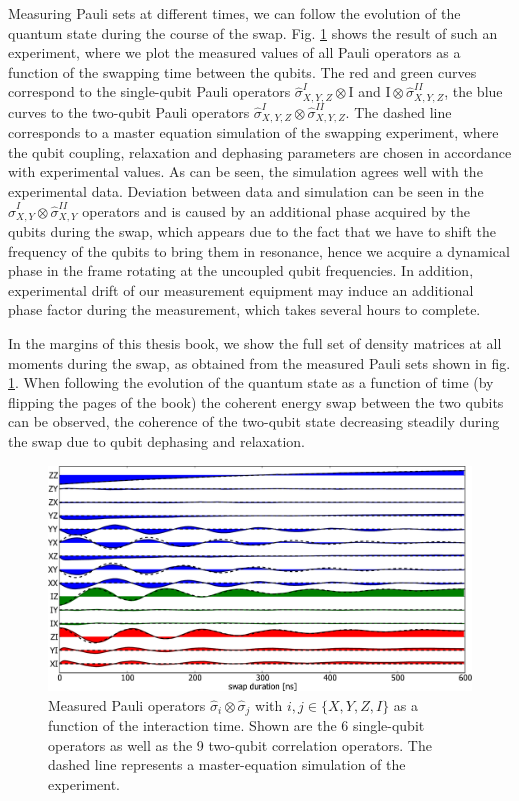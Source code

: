 Measuring Pauli sets at different times, we can follow the evolution of the quantum state during the course of the swap. Fig. \ref{fig:swap_pauli_set_vs_time_with_simulation} shows the result of such an experiment, where we plot the measured values of all Pauli operators as a function of the swapping time between the qubits. The red and green curves correspond to the single-qubit Pauli operators $\hat{\sigma}^I_{X,Y,Z}\otimes \mathrm{I}$ and $\mathrm{I}\otimes \hat{\sigma}^{II}_{X,Y,Z}$, the blue curves to the two-qubit Pauli operators $\hat{\sigma}_{X,Y,Z}^I\otimes \hat{\sigma}_{X,Y,Z}^{II}$. The dashed line corresponds to a master equation simulation of the swapping experiment, where the qubit coupling, relaxation and dephasing parameters are chosen in accordance with experimental values. As can be seen, the simulation agrees well with the experimental data. Deviation between data and simulation can be seen in the $\hat{\sigma}_{X,Y}^I\otimes \hat{\sigma}_{X,Y}^{II}$ operators and is caused by an additional phase acquired by the qubits during the swap, which appears due to the fact that we have to shift the frequency of the qubits to bring them in resonance, hence we acquire a dynamical phase in the frame rotating at the uncoupled qubit frequencies. In addition, experimental drift of our measurement equipment may induce an additional phase factor during the measurement, which takes several hours to complete.

\smallskip

In the margins of this thesis book, we show the full set of density matrices at all moments during the swap, as obtained from the measured Pauli sets shown in fig. \ref{fig:swap_pauli_set_vs_time_with_simulation}. When following the evolution of the quantum state as a function of time (by flipping the pages of the book) the coherent energy swap between the two qubits can be observed, the coherence of the two-qubit state decreasing steadily during the swap due to qubit dephasing and relaxation.

\begin{figure}[ht!]
   \centering
	 \includegraphics[width=1.\textwidth]{"./data/ct5/film of swap/pauli_set_vs_time_with_simulation"}
	 \caption[]{Measured Pauli operators $\hat{\sigma}_i \otimes \hat{\sigma}_j$ with $i,j \in \{X,Y,Z,I\}$ as a function of the interaction time. Shown are the 6 single-qubit operators as well as the 9 two-qubit correlation operators. The dashed line represents a master-equation simulation of the experiment.}
	 \label{fig:swap_pauli_set_vs_time_with_simulation}
\end{figure}

